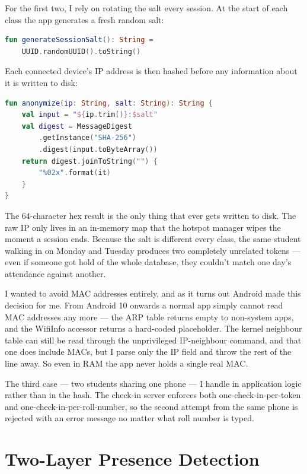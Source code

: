 \documentclass[sigconf,10pt]{acmart}
\begin{document}
For the first two, I rely on rotating the salt every session. At
the start of each class the app generates a fresh random salt:

\begin{lstlisting}[language=Kotlin]
fun generateSessionSalt(): String =
    UUID.randomUUID().toString()
\end{lstlisting}

Each connected device's IP address is then hashed before any
information about it is written to disk:

\begin{lstlisting}[language=Kotlin]
fun anonymize(ip: String, salt: String): String {
    val input = "${ip.trim()}:$salt"
    val digest = MessageDigest
        .getInstance("SHA-256")
        .digest(input.toByteArray())
    return digest.joinToString("") {
        "%02x".format(it)
    }
}
\end{lstlisting}

The 64-character hex result is the only thing that ever gets
written to disk. The raw IP only lives in an in-memory map that
the hotspot manager wipes the moment a session ends. Because the
salt is different every class, the same student walking in on
Monday and Tuesday produces two completely unrelated tokens ---
even if someone got hold of the whole database, they couldn't
match one day's attendance against another.

I wanted to avoid MAC addresses entirely, and as it turns out
Android made this decision for me. From Android 10 onwards a
normal app simply cannot read MAC addresses any more --- the ARP
table returns empty to non-system apps, and the WifiInfo accessor
returns a hard-coded placeholder. The kernel neighbour table can
still be read through the unprivileged IP-neighbour command, and
that one does include MACs, but I parse only the IP field and
throw the rest of the line away. So even in RAM the app never
holds a single real MAC.

The third case --- two students sharing one phone --- I handle in
application logic rather than in the hash. The check-in server
enforces both one-check-in-per-token and one-check-in-per-roll-number,
so the second attempt from the same phone is rejected with an
error message no matter what roll number is typed.

\section{Two-Layer Presence Detection}
\end{document}
